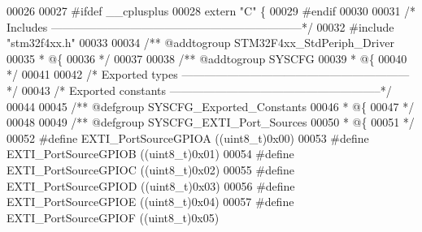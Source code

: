 \begin{DoxyCode}
00026 
00027 \textcolor{preprocessor}{#}\textcolor{preprocessor}{ifdef} \_\_cplusplus
00028  \textcolor{keyword}{extern} \textcolor{stringliteral}{"C"} \{
00029 \textcolor{preprocessor}{#}\textcolor{preprocessor}{endif}
00030 
00031 \textcolor{comment}{/* Includes ------------------------------------------------------------------*/}
00032 \textcolor{preprocessor}{#}\textcolor{preprocessor}{include} "stm32f4xx.h"
00033 
00034 \textcolor{comment}{/** @addtogroup STM32F4xx\_StdPeriph\_Driver}
00035 \textcolor{comment}{  * @\{}
00036 \textcolor{comment}{  */}
00037 
00038 \textcolor{comment}{/** @addtogroup SYSCFG}
00039 \textcolor{comment}{  * @\{}
00040 \textcolor{comment}{  */}
00041 
00042 \textcolor{comment}{/* Exported types ------------------------------------------------------------*/}
00043 \textcolor{comment}{/* Exported constants --------------------------------------------------------*/}
00044 
00045 \textcolor{comment}{/** @defgroup SYSCFG\_Exported\_Constants }
00046 \textcolor{comment}{  * @\{}
00047 \textcolor{comment}{  */}
00048 
00049 \textcolor{comment}{/** @defgroup SYSCFG\_EXTI\_Port\_Sources }
00050 \textcolor{comment}{  * @\{}
00051 \textcolor{comment}{  */}
00052 \textcolor{preprocessor}{#}\textcolor{preprocessor}{define} \textcolor{preprocessor}{EXTI\_PortSourceGPIOA}       \textcolor{preprocessor}{(}\textcolor{preprocessor}{(}\textcolor{preprocessor}{uint8\_t}\textcolor{preprocessor}{)}0x00\textcolor{preprocessor}{)}
00053 \textcolor{preprocessor}{#}\textcolor{preprocessor}{define} \textcolor{preprocessor}{EXTI\_PortSourceGPIOB}       \textcolor{preprocessor}{(}\textcolor{preprocessor}{(}\textcolor{preprocessor}{uint8\_t}\textcolor{preprocessor}{)}0x01\textcolor{preprocessor}{)}
00054 \textcolor{preprocessor}{#}\textcolor{preprocessor}{define} \textcolor{preprocessor}{EXTI\_PortSourceGPIOC}       \textcolor{preprocessor}{(}\textcolor{preprocessor}{(}\textcolor{preprocessor}{uint8\_t}\textcolor{preprocessor}{)}0x02\textcolor{preprocessor}{)}
00055 \textcolor{preprocessor}{#}\textcolor{preprocessor}{define} \textcolor{preprocessor}{EXTI\_PortSourceGPIOD}       \textcolor{preprocessor}{(}\textcolor{preprocessor}{(}\textcolor{preprocessor}{uint8\_t}\textcolor{preprocessor}{)}0x03\textcolor{preprocessor}{)}
00056 \textcolor{preprocessor}{#}\textcolor{preprocessor}{define} \textcolor{preprocessor}{EXTI\_PortSourceGPIOE}       \textcolor{preprocessor}{(}\textcolor{preprocessor}{(}\textcolor{preprocessor}{uint8\_t}\textcolor{preprocessor}{)}0x04\textcolor{preprocessor}{)}
00057 \textcolor{preprocessor}{#}\textcolor{preprocessor}{define} \textcolor{preprocessor}{EXTI\_PortSourceGPIOF}       \textcolor{preprocessor}{(}\textcolor{preprocessor}{(}\textcolor{preprocessor}{uint8\_t}\textcolor{preprocessor}{)}0x05\textcolor{preprocessor}{)}

\end{DoxyCode}
